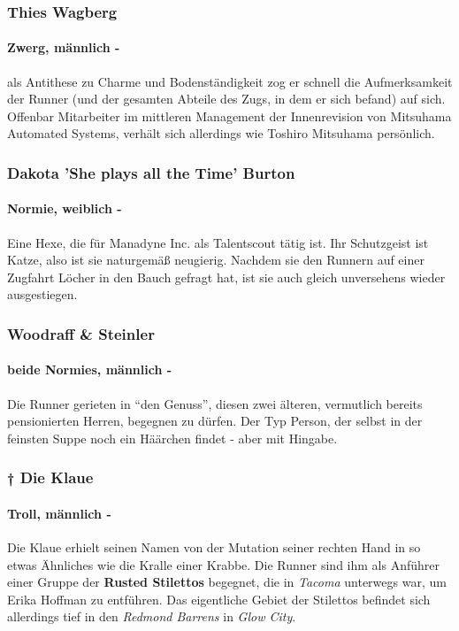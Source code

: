     
    \subsubsection{Thies Wagberg}
    \paragraph{Zwerg, männlich -} als Antithese zu Charme und Bodenständigkeit zog er schnell die Aufmerksamkeit der Runner (und der gesamten Abteile des Zugs, in dem er sich befand) auf sich. Offenbar Mitarbeiter im mittleren Management der Innenrevision von Mitsuhama Automated Systems, verhält sich allerdings wie Toshiro Mitsuhama persönlich.
    
    \subsubsection{Dakota ’She plays all the Time’ Burton}
    \paragraph{Normie, weiblich -} Eine Hexe, die für Manadyne Inc. als Talentscout tätig ist. Ihr Schutzgeist ist Katze, also ist sie naturgemäß neugierig. Nachdem sie den Runnern auf einer Zugfahrt Löcher in den Bauch gefragt hat, ist sie auch gleich unversehens wieder ausgestiegen.
    
    \subsubsection{Woodraff \& Steinler}
    \paragraph{beide Normies, männlich -} Die Runner gerieten in ``den Genuss'', diesen zwei älteren, vermutlich bereits pensionierten Herren, begegnen zu dürfen. Der Typ Person, der selbst in der feinsten Suppe noch ein Häärchen findet - aber mit Hingabe.
    

    \subsubsection{\textsf{†} Die Klaue}
    \paragraph{Troll, männlich -} Die Klaue erhielt seinen Namen von der Mutation seiner rechten Hand in so etwas Ähnliches wie die Kralle einer Krabbe. Die Runner sind ihm als Anführer einer Gruppe der \textbf{Rusted Stilettos} begegnet, die in \textit{Tacoma} unterwegs war, um Erika Hoffman zu entführen. Das eigentliche Gebiet der Stilettos befindet sich allerdings tief in den \textit{Redmond Barrens} in \textit{Glow City}.
    

